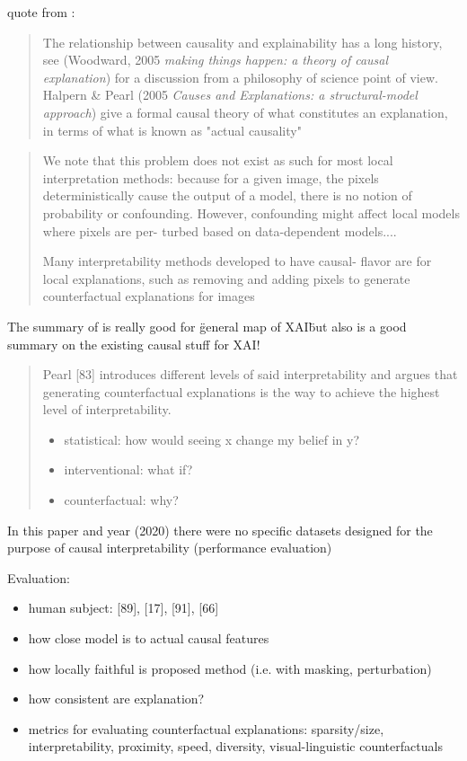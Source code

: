 {
\color{red}
quote from \cite{Goyal2019}:

\begin{quote}
The relationship between causality and explainability has a
long history, see (Woodward, 2005 \textit{making things happen: a theory of causal explanation}) for a discussion from
a philosophy of science point of view. Halpern \& Pearl
(2005 \textit{Causes and Explanations: a structural-model approach}) give a formal causal theory of what constitutes an
explanation, in terms of what is known as "actual causality"
\end{quote}

\begin{quote}
We note that this problem does not exist as such for most
local interpretation methods: because for a given image,
the pixels deterministically cause the output of a model,
there is no notion of probability or confounding. However,
confounding might affect local models where pixels are per-
turbed based on data-dependent models....

Many interpretability methods developed to have causal-
flavor are for local explanations, such as removing and
adding pixels to generate counterfactual explanations for
images
\end{quote}

The summary of \cite{Moraffah2020a} is really good for \"general map of XAI\" but also is a good summary on the existing causal stuff for XAI! 

\begin{quote}
Pearl [83] introduces different levels of said interpretability
and argues that generating counterfactual explanations is
the way to achieve the highest level of interpretability.

\begin{itemize}
      \item statistical: how would seeing x change my belief in y?
      \item interventional: what if?
      \item counterfactual: why?
\end{itemize}
\end{quote}

In this paper and year (2020) there were no specific datasets designed for the purpose of causal interpretability (performance evaluation)

Evaluation:

\begin{itemize}
      \item human subject: [89], [17], [91], [66]
      \item how close model is to actual causal features
      \item how locally faithful is proposed method (i.e. with masking, perturbation)
      \item how consistent are explanation? 
      \item metrics for evaluating counterfactual explanations: sparsity/size, interpretability, proximity, speed, diversity, visual-linguistic counterfactuals
\end{itemize}

}
